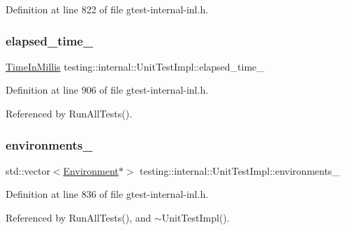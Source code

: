 Definition at line 822 of file gtest-\/internal-\/inl.\+h.

\mbox{\label{classtesting_1_1internal_1_1UnitTestImpl_a06e0445298c6026bee71bb2bb7aae604}} 
\subsubsection{\texorpdfstring{elapsed\+\_\+time\+\_\+}{elapsed\_time\_}}
{\footnotesize\ttfamily \hyperlink{namespacetesting_1_1internal_a66a845df404b38fe85c5e14a069f255a}{Time\+In\+Millis} testing\+::internal\+::\+Unit\+Test\+Impl\+::elapsed\+\_\+time\+\_\+\hspace{0.3cm}{\ttfamily [private]}}



Definition at line 906 of file gtest-\/internal-\/inl.\+h.



Referenced by Run\+All\+Tests().

\mbox{\label{classtesting_1_1internal_1_1UnitTestImpl_a1d2320ba1e4e1cad8d624bbb222501fb}} 
\subsubsection{\texorpdfstring{environments\+\_\+}{environments\_}}
{\footnotesize\ttfamily std\+::vector$<$\hyperlink{classtesting_1_1Environment}{Environment}$\ast$$>$ testing\+::internal\+::\+Unit\+Test\+Impl\+::environments\+\_\+\hspace{0.3cm}{\ttfamily [private]}}



Definition at line 836 of file gtest-\/internal-\/inl.\+h.



Referenced by Run\+All\+Tests(), and $\sim$\+Unit\+Test\+Impl().


